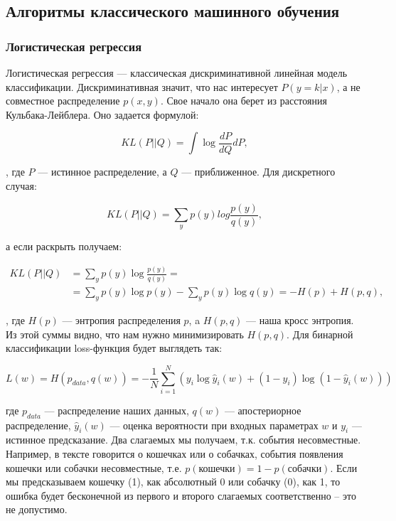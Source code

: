 \subsection{Алгоритмы классического машинного обучения}

\subsubsection{Логистическая регрессия}
\label{subsection:logreg}

Логистическая регрессия --- классическая дискриминативной линейная модель классификации. Дискриминативная
значит, что нас интересует $P (y = k | x)$, а не совместное распределение $p (x, y)$. Свое начало она берет из
расстояния Кульбака-Лейблера. Оно задается формулой:

\begin{equation}
 KL(P||Q) = \int\log\frac{dP}{dQ}dP,
\end{equation}

, где $P$ --- истинное распределение, а $Q$ --- приближенное. Для дискретного случая:

\begin{equation}
 KL(P||Q) = \sum_{y} p(y)log\frac{p(y)}{q(y)},
\end{equation}

а если раскрыть получаем:

\begin{equation}
\begin{aligned}
 KL(P||Q) & = \sum_y p(y)\log\frac{p(y)}{q(y)} = \\
 & = \sum_y p(y) \log p(y) - \sum_y p(y) \log q(y) = - H(p) + H(p,q),
\end{aligned}
\end{equation}

, где $H(p)$ ---  энтропия распределения $p$, a $H(p, q)$ --- наша кросс энтропия. Из этой суммы видно, что
нам нужно минимизировать $H(p, q)$. Для бинарной классификации loss-функция будет выглядеть так:

\begin{equation} \label{eq:logLoss}
 L(w)= H(p_{data}, q(w)) = -\frac{1}{N}\sum_{i=1}^N(y_i\log\hat y_i(w) + (1-y_i)\log(1-\hat y_i(w)))
\end{equation}

где $p_{data}$ --- распределение наших данных, $q(w)$ --- апостериорное распределение,  $\hat y_i(w)$ ---
оценка вероятности при входных параметрах $w$ и $y_i$ --- истинное предсказание. Два слагаемых мы получаем,
т.к. события несовместные. Например, в тексте говорится о кошечках или о собачках, события появления кошечки
или собачки несовместные, т.е. $p(\text{кошечки}) = 1 - p(\text{собачки})$. Если мы предсказываем кошечку (1),
как абсолютный 0 или собачку (0), как 1, то ошибка будет бесконечной из первого и второго слагаемых
соответственно -- это не допустимо.

